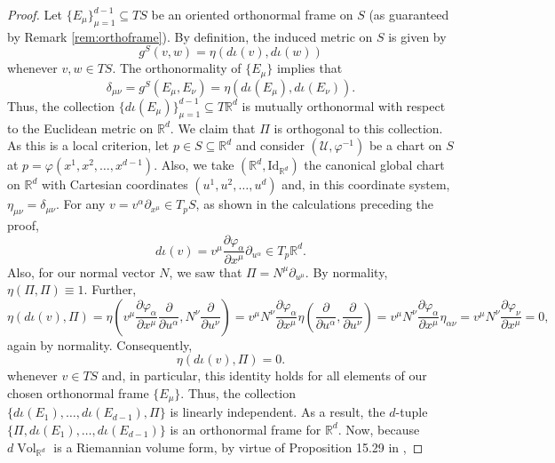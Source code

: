 \documentclass{article}
\newcommand{\p}{\partial}
\newcommand{\R}{\mathbb{R}}
\newcommand{\al}{\alpha}
\newcommand{\f}[2]{\frac{#1}{#2}}
\newcommand{\lp}{\left(}
\newcommand{\rp}{\right)}
\theoremstyle{theorem}
\newcommand{\Vol}{\operatorname{Vol}}
\begin{document}
\begin{proof}
Let $\{ E_\mu \}_{\mu = 1}^{d-1}\subseteq TS$ be an oriented orthonormal frame on $S$ (as guaranteed by Remark \ref{rem:orthoframe}). By definition, the induced metric on $S$ is given by 
\begin{equation*}
    g^S(v,w) = \eta(d\iota (v), d\iota(w))
\end{equation*}
whenever $v,w\in TS$. The orthonormality of $\{E_\mu\}$ implies that 
\begin{equation*}
    \delta_{\mu\nu} = g^S(E_\mu,E_\nu) = \eta(d\iota(E_\mu), d\iota(E_\nu)).
\end{equation*}
Thus, the collection $\{ d\iota(E_\mu) \}_{\mu = 1}^{d-1}\subseteq T\R^d$ is mutually orthonormal with respect to the Euclidean metric on $\mathbb{R}^d$. We claim that $\Pi$ is orthogonal to this collection. As this is a local criterion, let $p\in S\subseteq\mathbb{R}^d$ and consider $(\mathcal{U},\varphi^{-1})$ be a chart on $S$ at $p=\varphi(x^1,x^2,\dots,x^{d-1})$. Also, we take $(\mathbb{R}^d,\mbox{Id}_{\mathbb{R}^d})$ the canonical global chart on $\mathbb{R}^d$ with Cartesian coordinates $(u^1,u^2,\dots,u^d)$ and, in this coordinate system, $\eta_{\mu\nu}=\delta_{\mu\nu}$. For any $v=v^\alpha\partial_{x^{\mu}}\in T_pS$, as shown in the calculations preceding the proof,
\begin{equation*}
d\iota(v)=v^{\mu}\frac{\partial\varphi_\al}{\partial x^\mu}\partial_{u^{\al}}\in T_p\mathbb{R}^d.
\end{equation*}
Also, for our normal vector $N$, we saw that $\Pi=N^{\mu}\partial_{u^\mu}$. By normality, $\eta(\Pi,\Pi)\equiv 1$. Further,
\begin{equation*}
    \eta(d\iota(v) , \Pi) = \eta\lp v^\mu\f{\p \varphi_\al }{ \p x^\mu} \f{\p}{\p u^\al}, N^\nu \f{\p}{\p u^\nu} \rp =  v^\mu N^\nu \f{\p \varphi_\al }{ \p x^\mu} \eta\lp \f{\p}{\p u^\alpha}, \f{\p}{\p u^\nu} \rp
    = v^\mu N^\nu \f{\p \varphi_\al }{ \p x^\mu} \eta_{\alpha\nu} = v^\mu N^\nu \f{\p \varphi_\nu }{ \p x^\mu} = 0,
\end{equation*}
again by normality. Consequently,
\begin{equation*}
    \eta(d\iota(v), \Pi) = 0.
\end{equation*}
whenever $v\in TS$ and, in particular, this identity holds for all elements of our chosen orthonormal frame $\{E_\mu\}$. Thus, the collection $\{ d\iota(E_1),\dots,d\iota(E_{d-1}),\Pi\}$ is linearly independent. As a result, the $d$-tuple $\{\Pi, d\iota(E_1),\dots, d\iota(E_{d-1})\}$ is an orthonormal frame for $\mathbb{R}^d$. Now, because $d\Vol_{\R^d}$ is a Riemannian volume form, by virtue of Proposition 15.29 in \cite{lee2013smooth}, 

\end{proof}
\end{document}
